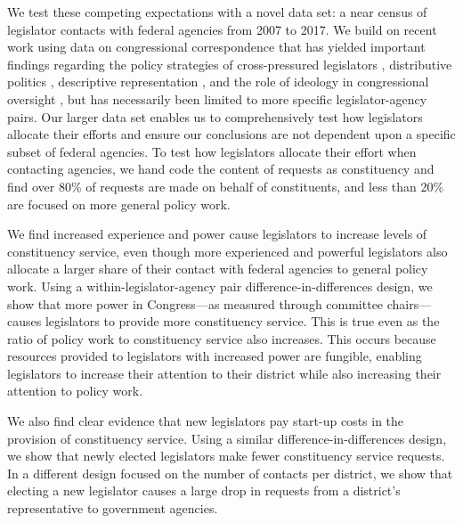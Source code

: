 \documentclass[12pt]{article}
\begin{document}
We test these competing expectations with a novel data set: a near census of legislator contacts with federal agencies from 2007 to 2017. We build on recent work using data on congressional correspondence that has yielded important findings regarding the policy strategies of cross-pressured legislators \citep{Ritchie2017}, distributive politics \citep{MillsKalafHuges2015}, descriptive representation \citep{LowandeRitchieLauterbach2018}, and the role of ideology in congressional oversight \citep{Lowande2018JOP}, but has necessarily been limited to more specific legislator-agency pairs. Our larger data set enables us to comprehensively test how legislators allocate their efforts and ensure our conclusions are not dependent upon a specific subset of federal agencies. To test how legislators allocate their effort when contacting agencies, we hand code the content of  requests as constituency and find over 80\% of requests are made on behalf of constituents, and less than 20\% are focused on more general policy work. 

We find increased experience and power cause legislators to increase levels of constituency service, even though more experienced and powerful legislators also allocate a larger share of their contact with federal agencies to general policy work. 
Using a within-legislator-agency pair difference-in-differences design, we show that more power in Congress---as measured through committee chairs---causes legislators to provide more constituency service. This is true even as the ratio of policy work to constituency service also increases. This occurs because resources provided to legislators with increased power are fungible, enabling legislators to increase their attention to their district while also increasing their attention to policy work.  

We also find clear evidence that new legislators pay start-up costs in the provision of constituency service. Using a similar difference-in-differences design, we show that newly elected legislators make fewer constituency service requests. In a different design focused on the number of contacts per district, we show that electing a new legislator causes a large drop in requests from a district's representative to government agencies.

 

\end{document}
